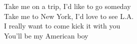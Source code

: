 Take me on a trip, I'd like to go someday \\
Take me to New York, I'd love to see L.A. \\
I really want to come kick it with you \\
You'll be my American boy\\

